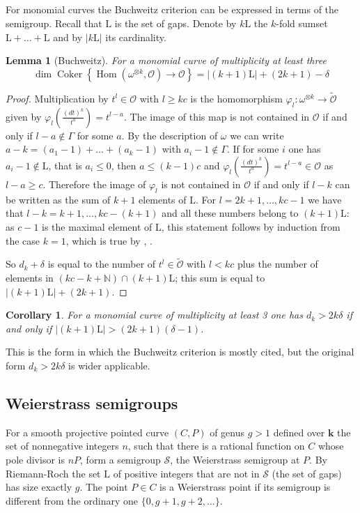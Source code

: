 \documentclass{amsart}
\newcommand{\N}{\mathbb{N}}
\newcommand{\vp}{\varphi}
\renewcommand{\S}{\mathcal S}
\renewcommand{\L}{\mathrm L}
\renewcommand{\k}{\mathbf{k}} %
\DeclareMathOperator{\Coker}{Coker}
\DeclareMathOperator{\Hom}{Hom}
\newcommand{\mO}{\mathcal{O}}
\newtheorem{lemma}[thm]{Lemma}
\newtheorem{cor}[thm]{Corollary}
\theoremstyle{definition}
\theoremstyle{remark}
\begin{document}
\subsection{}
For monomial curves the Buchweitz criterion can be expressed in terms of the semigroup.
Recall that $\L$ is the set of gaps. Denote by $k\L$ the $k$-fold sumset $\L+\dots+\L$
and by  $|k\L|$ its cardinality.

\begin{lemma}[Buchweitz] For  a monomial curve of multiplicity at least three
\[ \dim \Coker \left\{\Hom(\omega^{\otimes k},\mO) \to \mO\right\} =
|(k+1)\L|+(2k+1)-\delta\]
\end{lemma}
\begin{proof}
Multiplication by  $t^l\in \mO$ with $l\geq kc$
is the homomorphism  $\vp_l\colon \omega^{\otimes k} \to
\widetilde {\mO}$ given by $\vp_l\left(\frac{(dt)^k}{t^a}\right)=t^{l-a}$. The image of this map
is not contained in $\mO$ if and only if
$l-a\notin \Gamma$ for some $a$. By the description of $\omega$
we can write $a-k=(a_1-1)+\dots+(a_k-1)$
with $a_i-1\notin \Gamma$. If for some $i$ one has $a_i-1\notin \L$, that is $a_i\leq0$,
then $a\leq (k-1)c$ and $\vp_l\left(\frac{(dt)^k}{t^a}\right)=t^{l-a}\in \mO$ as $l-a\geq c$.
Therefore the image of $\vp_l$ is not  contained in $\mO$ if and only if
$l-k$ can be written as the sum of  $k+1$ elements  of $\L$.
For $l=2k+1,\dots, kc-1$ we have that $l-k=k+1,\dots,kc-(k+1)$ and all these
numbers belong to $(k+1)\L$: as $c-1$ is the maximal element of $\L$, this statement
follows by induction from the case $k=1$, which is true by \cite[4.2]{Bu}, \cite[Thm. (1.3)]{Ol}. 

So $d_k+\delta$ is equal to the number of $t^l\in\widetilde {\mO}$ with $l<kc$
plus the number of elements in $(kc-k+\N)\cap(k+1)\L$; this sum is equal
to $|(k+1)\L|+(2k+1)$.
\end{proof}

\begin{cor}
For  a monomial curve of multiplicity at least 3 one has
$d_k>2k\delta$ if and only if $|(k+1)\L|>(2k+1)(\delta-1)$.
\end{cor}

This is the form in which the Buchweitz criterion is mostly cited, but  
the original form $d_k>2k\delta$ is wider applicable.

\subsection{Weierstrass semigroups}
For  a smooth projective pointed curve $(C,P)$ of genus $g>1$ defined
over $\k$ the set of nonnegative integers $n$, such that there is a rational
function on $C$ whose pole divisor is $nP$, form a semigroup $\S$, the Weierstrass semigroup
at $P$. By Riemann-Roch
the set $\L$ of positive integers that are not in $\S$ (the set of gaps) has size exactly $g$.
The point $P\in C$ is a  Weierstrass point if its 
semigroup is different from the ordinary one $\{0, g+1, g+2, \dots\}$.
\end{document}
